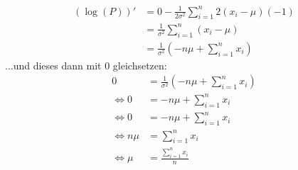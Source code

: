 \documentclass[a4paper]{scrartcl}
\begin{document}
\begin{align*}
	(\log(P))' &= 0 - \frac{1}{2\sigma^2}\sum_{i=1}^{n} 2(x_i-\mu)(-1)\\
	&= \frac{1}{\sigma^2}\sum_{i=1}^{n} (x_i-\mu)\\
	&= \frac{1}{\sigma^2}(- n\mu + \sum_{i=1}^{n} x_i)
\end{align*}
...und dieses dann mit 0 gleichsetzen:
\begin{align*}
	0 &= \frac{1}{\sigma^2}(- n\mu + \sum_{i=1}^{n} x_i)\\
	\Leftrightarrow 0 &=- n\mu + \sum_{i=1}^{n} x_i\\
	\Leftrightarrow 0 &= - n\mu + \sum_{i=1}^{n} x_i\\
	\Leftrightarrow n\mu &= \sum_{i=1}^{n} x_i\\
	\Leftrightarrow \mu &= \frac{\sum_{i=1}^{n} x_i}{n}
\end{align*}
\end{document}
